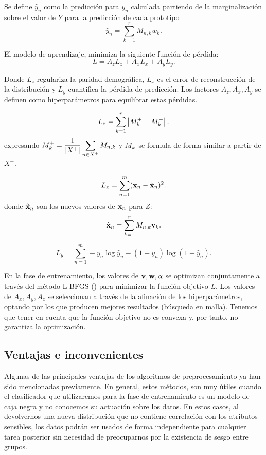 \documentclass[oneside,openright,titlepage,numbers=noenddot,openany,headinclude,footinclude=true,
cleardoublepage=empty,abstractoff,BCOR=5mm,paper=a4,fontsize=12pt,main=spanish]{scrreprt}
\begin{document}
Se define $\hat{y}_n$ como la predicción para $y_n$ calculada partiendo de la marginalización sobre el valor de $Y$ para la predicción de cada prototipo
\begin{equation*}
\hat{y}_n=\sum_{k=1}^r M_{n,k} w_k.
\end{equation*}

El modelo de aprendizaje, minimiza la siguiente función de pérdida:
\begin{equation*}
L=A_zL_z+A_xL_x+A_yL_y.   
\end{equation*}

Donde $L_z$ regulariza la paridad demográfica, $L_x$ es el error de reconstrucción de la distribución y $L_y$ cuantifica la pérdida de predicción. Los factores $A_z, A_x, A_y$ se definen como hiperparámetros para equilibrar estas pérdidas.

\begin{equation*}
L_z=\sum_{k=1}^r \left\lvert M_k^+-M_k^-\right\rvert.
\end{equation*}
expresando $\displaystyle M_k^+=\frac{1}{\left\lvert X^+\right\rvert} \sum_{n\in X^+} M_{n,k}$ y $M_k^-$ se formula de forma similar a partir de $X^-$.

\begin{equation*}
L_x=\sum_{n=1}^m (\textbf{x}_n-\hat{\textbf{x}}_n)^2.
\end{equation*}
donde $\hat{\textbf{x}}_n$ son los nuevos valores de $\textbf{x}_n$ para $Z$:
\begin{equation*}
\hat{\textbf{x}}_n=\sum_{k=1}^r M_{n,k}\textbf{v}_k.
\end{equation*}

\begin{equation*}
L_y=\sum_{n=1}^m -y_n \log \hat{y}_n -(1-y_n) \log (1-\hat{y}_n).
\end{equation*}

En la fase de entrenamiento, los valores de $\textbf{v}, \textbf{w}, \upalpha$ se optimizan conjuntamente a través del método L-BFGS (\cite{lbfgs1997}) para minimizar la función objetivo $L$. Los valores de $A_x,A_y,A_z$ se seleccionan a través de la afinación de los hiperparámetros, optando por los que producen mejores resultados (búsqueda en malla). Tenemos que tener en cuenta que la función objetivo no es convexa y, por tanto, no garantiza la optimización.

\subsection{Ventajas e inconvenientes}

Algunas de las principales ventajas de los algoritmos de preprocesamiento ya han sido mencionadas previamente. En general, estos métodos, son muy útiles cuando el clasificador que utilizaremos para la fase de entrenamiento es un modelo de caja negra y no conocemos su actuación sobre los datos. En estos casos, al devolvernos una nueva distribución que no contiene correlación con los atributos sensibles, los datos podrán ser usados de forma independiente para cualquier tarea posterior sin necesidad de preocuparnos por la existencia de sesgo entre grupos.
\end{document}
